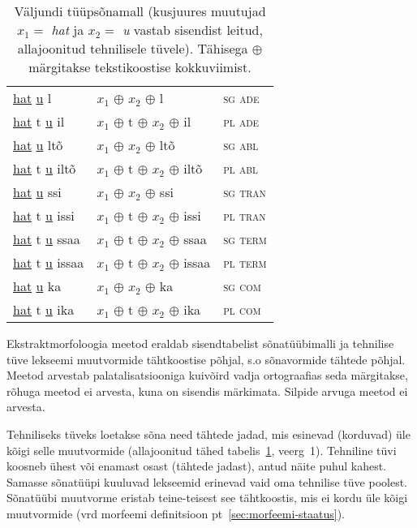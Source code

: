 \documentclass[12pt,a4paper]{article}
\begin{document}
\begin{table}[H]
\begin{minipage}[t]{.55\textwidth}
\begin{tabular}[t]{l l l}
      \underline{hat}   \underline{u} l     & $x_1$ $\oplus$ $x_2$ $\oplus$ l         & \textsc{sg ade} \\
      \underline{hat} t \underline{u} il    & $x_1$ $\oplus$ t $\oplus$ $x_2$ $\oplus$ il    & \textsc{pl ade} \\
      \underline{hat}   \underline{u} ltõ   & $x_1$ $\oplus$ $x_2$ $\oplus$ ltõ       & \textsc{sg abl} \\
      \underline{hat} t \underline{u} iltõ  & $x_1$ $\oplus$ t $\oplus$ $x_2$ $\oplus$ iltõ  & \textsc{pl abl} \\
      \underline{hat}   \underline{u} ssi   & $x_1$ $\oplus$ $x_2$ $\oplus$ ssi       & \textsc{sg tran} \\
      \underline{hat} t \underline{u} issi  & $x_1$ $\oplus$ t $\oplus$ $x_2$ $\oplus$ issi  & \textsc{pl tran} \\
      \underline{hat} t \underline{u} ssaa  & $x_1$ $\oplus$ t $\oplus$ $x_2$ $\oplus$ ssaa  & \textsc{sg term} \\
      \underline{hat} t \underline{u} issaa & $x_1$ $\oplus$ t $\oplus$ $x_2$ $\oplus$ issaa & \textsc{pl term} \\
      \underline{hat}   \underline{u} ka    & $x_1$ $\oplus$ $x_2$ $\oplus$ ka        & \textsc{sg com} \\
      \underline{hat} t \underline{u} ika   & $x_1$ $\oplus$ t $\oplus$ $x_2$ $\oplus$ ika   & \textsc{pl com} \\
    \end{tabular}
    \caption{Väljundi tüüpsõnamall (kus\-juures muutujad $x_1 = $ \textit{hat} ja $x_2 = $ \textit{u} vastab sisendist leitud, allajoonitud tehnilisele tüvele). Tähisega $\oplus$ märgitakse teksti\-koostise kokku\-viimist.}
    \label{tab:väljundtabel-katto}
  \end{minipage}
\end{table}

Ekstraktmorfoloogia meetod eraldab sisendtabelist sõna\-tüübi\-malli ja tehnilise tüve lekseemi muutvormide tähtkoostise põhjal, s.o sõnavormide tähtede põhjal. Meetod arvestab palatalisatsiooniga kuivõird vadja ortograafias seda märgitakse, rõhuga meetod ei arvesta, kuna on sisendis märkimata. Silpide arvuga meetod ei arvesta. %

Tehniliseks tüveks loetakse sõna need tähtede jadad, mis esinevad (korduvad) üle kõigi selle muutvormide (allajoonitud tähed tabelis~\ref{tab:väljundtabel-katto}, veerg~1). Tehniline tüvi koosneb ühest või enamast osast (tähtede jadast), antud näite puhul kahest. Samasse sõnatüüpi kuuluvad lekseemid erinevad vaid oma tehnilise tüve poolest. %
Sõnatüübi muutvorme eristab teine-teisest see tähtkoostis, mis ei kordu üle kõigi muutvormide (vrd morfeemi definitsioon pt~\ref{sec:morfeemi-staatus}).
\end{document}
